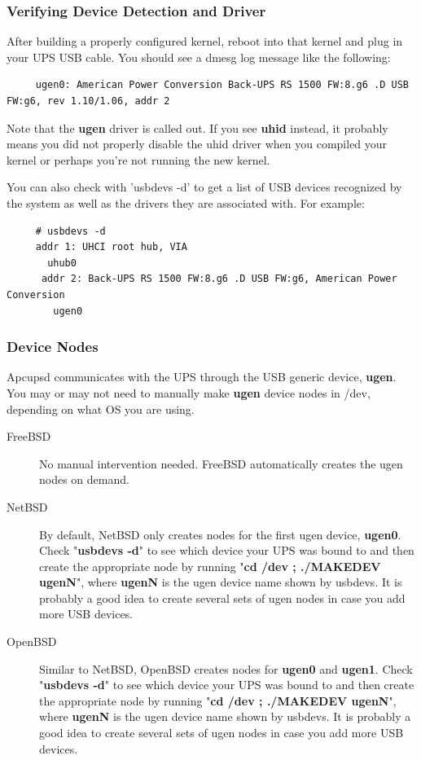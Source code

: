 \subsubsection*{Verifying Device Detection and Driver}

After building a properly configured kernel, reboot into that kernel and plug
in your UPS USB cable. You should see a dmesg log message like the following: 

\begin{verbatim}
     ugen0: American Power Conversion Back-UPS RS 1500 FW:8.g6 .D USB FW:g6, rev 1.10/1.06, addr 2
\end{verbatim}

Note that the {\bf ugen} driver is called out. If you see {\bf uhid} instead, it
probably means you did not properly disable the uhid driver when you compiled
your kernel or perhaps you're not running the new kernel.

You can also check with 'usbdevs -d' to get a list of USB devices recognized
by the system as well as the drivers they are associated with. For example: 

\begin{verbatim}
     # usbdevs -d
     addr 1: UHCI root hub, VIA
       uhub0
      addr 2: Back-UPS RS 1500 FW:8.g6 .D USB FW:g6, American Power Conversion
        ugen0
\end{verbatim}

\subsubsection*{Device Nodes}

Apcupsd communicates with the UPS through the USB generic device, {\bf ugen}.
You may or may not need to manually make {\bf ugen} device nodes in /dev, 
depending on what OS you are using.  

\begin{description}
\item [FreeBSD]
No manual intervention needed. FreeBSD automatically creates the ugen
nodes on demand.

\item [NetBSD]
By default, NetBSD only creates nodes for the first ugen device, {\bf ugen0}.
Check "{\bf usbdevs -d}" to see which device your UPS was bound to and then
create the appropriate node by running "{\bf cd /dev ; ./MAKEDEV ugenN}",
where {\bf ugenN} is the ugen device name shown by usbdevs. It is probably
a good idea to create several sets of ugen nodes in case you add more USB
devices.

\item [OpenBSD]
Similar to NetBSD, OpenBSD creates nodes for {\bf ugen0} and {\bf ugen1}.
Check "{\bf usbdevs -d}" to see which device your UPS was bound to and then
create the appropriate node by running "{\bf cd /dev ; ./MAKEDEV ugenN}",
where {\bf ugenN} is the ugen device name shown by usbdevs. It is probably
a good idea to create several sets of ugen nodes in case you add more USB
devices.
\end{description}


